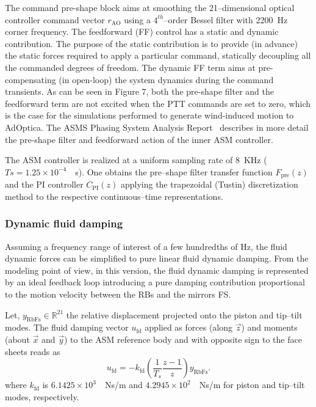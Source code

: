 The command pre-shape block aims at smoothing the 21--dimensional optical controller command vector $r_\text{AO}$ using a $4^{th}$--order Bessel filter with \SI{2200}{Hz} corner frequency. 
The feedforward (FF) control has a static and dynamic contribution. The purpose of the static contribution is to provide (in advance) the static forces required to apply a particular command, statically decoupling all the commanded degrees of freedom. The dynamic FF term aims at pre-compensating (in open-loop) the system dynamics during the command transients. 
As can be seen in Figure 7, both the pre-shape filter and the feedforward term are not excited when the PTT commands are set to zero, which is the case for the simulations performed to generate wind-induced motion to AdOptica. The ASMS Phasing System Analysis Report~\cite[Section~4.1.3]{ADP_PhasingRep2021} describes in more detail the pre-shape filter and feedforward action of the inner ASM controller.

The ASM controller is realized at a uniform sampling rate of \SI{8}{KHz} ($Ts = 1.25 \times 10^{-4}$~\SI{}{s}). One obtains the pre--shape filter transfer function $F_\text{pre}(z)$ and the PI controller $C_\text{PI}(z)$ applying the trapezoidal (Tustin) discretization method to the respective continuous--time representations. %


\subsubsection*{Dynamic fluid damping}

Assuming a frequency range of interest of a few hundredths of Hz, the fluid dynamic forces can be simplified to pure linear fluid dynamic damping. From the modeling point of view, in this version, the fluid dynamic damping is represented by an ideal feedback loop introducing a pure damping contribution proportional to the motion velocity between the RBs and the mirrors FS. 

Let, $y_\text{RbFs} \in \mathbb{R}^{21}$ the relative displacement projected onto the piston and tip--tilt modes. The fluid damping vector $u_\text{fd}$ applied as forces (along $\overrightarrow{z}$) and moments (about $\overrightarrow{x}$ and $\overrightarrow{y}$) to the ASM reference body and with opposite sign to the face sheets reads as
\[
u_\text{fd} = -k_\text{fd} \left(\frac{1}{T_s}\frac{z-1}{z}\right) y_\text{RbFs}.
\]
where $k_\text{fd}$ is $6.1425\times 10^{3}$~\SI{}{Ns/m} and $4.2945\times 10^{2}$~\SI{}{Ns/m} for piston and tip--tilt modes, respectively. 
%